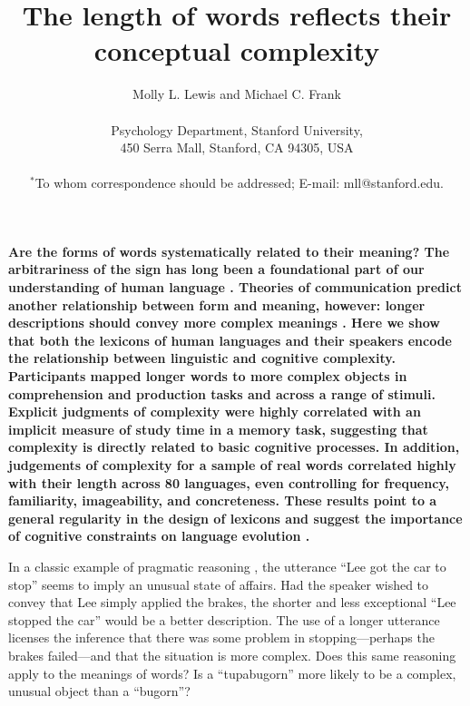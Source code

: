 \documentclass[12pt]{article}
\title{The length of words reflects their conceptual complexity}
\author
{Molly L. Lewis and Michael C. Frank\\
\\
\normalsize{Psychology Department, Stanford University,}\\
\normalsize{450 Serra Mall, Stanford, CA 94305, USA}\\
\\
\normalsize{$^\ast$To whom correspondence should be addressed; E-mail: mll@stanford.edu.}
}
\date{}
\newenvironment{sciabstract}{%
\begin{quote} \bf}
{\end{quote}}
\begin{document}
 

\baselineskip24pt

\maketitle 




{\bf Are the forms of words systematically related to their meaning? The arbitrariness of the sign has long been a foundational part of our understanding of human language \cite{saussure,hockett1960}. Theories of communication predict another relationship between form and meaning, however: longer descriptions should convey more complex meanings \cite{horn1984,jaeger2006}. Here we show that both the lexicons of human languages and their speakers encode the relationship between linguistic and cognitive complexity. Participants mapped longer words to more complex objects in comprehension and production tasks and across a range of stimuli. Explicit judgments of complexity were highly correlated with an implicit measure of study time in a memory task, suggesting that complexity is directly related to basic cognitive processes. In addition, judgements of complexity for a sample of real words correlated highly with their length across 80 languages, even controlling for frequency, familiarity, imageability, and concreteness. These results point to a general regularity in the design of lexicons and suggest the importance of cognitive constraints on language evolution \cite{christiansen2008,lieberman2007}.}


In a classic example of pragmatic reasoning \cite{horn1984}, the utterance ``Lee got the car to stop'' seems to imply an unusual state of affairs. Had the speaker wished to convey that Lee simply applied the brakes, the shorter and less exceptional ``Lee stopped the car'' would be a better description. The use of a longer utterance licenses the inference that there was some problem in stopping---perhaps the brakes failed---and that the situation is more complex. Does this same reasoning apply to the meanings of words? Is a ``tupabugorn'' more likely to be a complex, unusual object than a ``bugorn''? 
\end{document}
